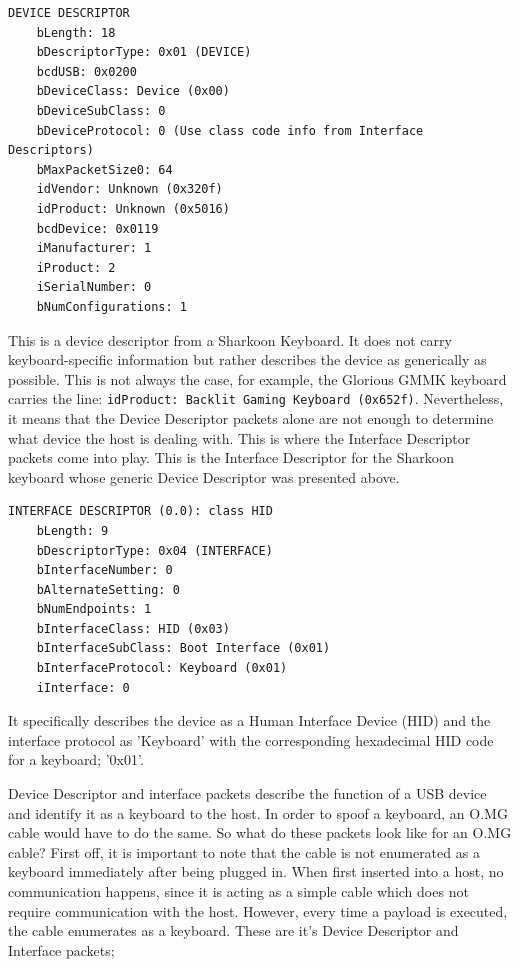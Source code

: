 \begin{lstlisting}[caption={Device Descriptor packet generated by an external keyboard},captionpos=b]
DEVICE DESCRIPTOR
    bLength: 18
    bDescriptorType: 0x01 (DEVICE)
    bcdUSB: 0x0200
    bDeviceClass: Device (0x00)
    bDeviceSubClass: 0
    bDeviceProtocol: 0 (Use class code info from Interface Descriptors)
    bMaxPacketSize0: 64
    idVendor: Unknown (0x320f)
    idProduct: Unknown (0x5016)
    bcdDevice: 0x0119
    iManufacturer: 1
    iProduct: 2
    iSerialNumber: 0
    bNumConfigurations: 1
\end{lstlisting}


This is a device descriptor from a Sharkoon Keyboard. It does not carry keyboard-specific information but rather describes the device as generically as possible. This is not always the case, for example, the Glorious GMMK keyboard carries the line: \verb|idProduct: Backlit Gaming Keyboard (0x652f)|. Nevertheless,
it means that the Device Descriptor packets alone are not enough to determine what device the host is dealing with. This is where the Interface Descriptor packets come into play.
This is the Interface Descriptor for the Sharkoon keyboard whose generic Device Descriptor was presented above.

\begin{lstlisting}[caption={Interface Descriptor packet generated by an external keyboard},captionpos=b]
INTERFACE DESCRIPTOR (0.0): class HID
    bLength: 9
    bDescriptorType: 0x04 (INTERFACE)
    bInterfaceNumber: 0
    bAlternateSetting: 0
    bNumEndpoints: 1
    bInterfaceClass: HID (0x03)
    bInterfaceSubClass: Boot Interface (0x01)
    bInterfaceProtocol: Keyboard (0x01)
    iInterface: 0
\end{lstlisting}

It specifically describes the device as a Human Interface Device (HID) and the interface protocol as 'Keyboard' with the corresponding hexadecimal HID code for a keyboard; '0x01'.

Device Descriptor and interface packets describe the function of a USB device and identify it as a keyboard to the host. In order to spoof a keyboard, an O.MG cable would have to do the same. So what do these packets look like for an O.MG cable?
First off, it is important to note that the cable is not enumerated as a keyboard immediately after being plugged in. When first inserted into a host, no communication happens, since it is acting as a simple cable which does not require communication with the host. However, every time a payload is executed, the cable enumerates as a keyboard.
These are it's Device Descriptor and Interface packets;

